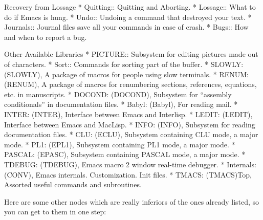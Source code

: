 Recovery from Lossage
* Quitting::    Quitting and Aborting.
* Lossage::     What to do if Emacs is hung.
* Undo::        Undoing a command that destroyed your text.
* Journals::    Journal files save all your commands in case of crash.
* Bugs::        How and when to report a bug.

Other Available Libraries
* PICTURE::     Subsystem for editing pictures made out of characters.
* Sort::        Commands for sorting part of the buffer.
* SLOWLY: (SLOWLY),     A package of macros for people using slow
                        terminals.
* RENUM:  (RENUM),      A package of macros for renumbering sections,
                        references, equations, etc. in manuscripts.
* DOCOND: (DOCOND),     Subsystem for ``assembly conditionals''
                        in documentation files.
* Babyl: (Babyl),        For reading mail.
* INTER: (INTER),       Interface between Emacs and Interlisp.
* LEDIT: (LEDIT),       Interface between Emacs and MacLisp.
* INFO: (INFO),         Subsystem for reading documentation files.
* CLU: (ECLU),          Subsystem containing CLU mode, a major mode.
* PL1: (EPL1),          Subsystem containing PL1 mode, a major mode.
* PASCAL: (EPASC),      Subsystem containing PASCAL mode, a major mode.
* TDEBUG: (TDEBUG),     Emacs macro 2 window real-time debugger.
* Internals: (CONV),    Emacs internals.  Customization.  Init files.
* TMACS: (TMACS)Top,    Assorted useful commands and subroutines.

Here are some other nodes which are really inferiors of the ones
already listed, so you can get to them in one step:

